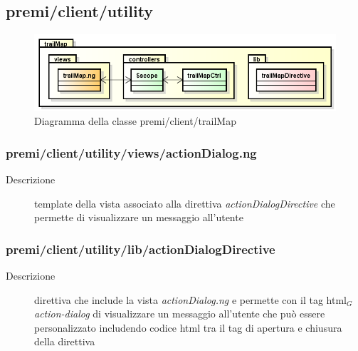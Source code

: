 \clearpage
\subsection{premi/client/utility}
\begin{figure}[H]
\begin{center}
\includegraphics[scale=0.70]{img/diapkg/trailMap.png}
\caption{Diagramma della classe premi/client/trailMap}
\end{center}
\end{figure}

\subsubsection{premi/client/utility/views/actionDialog.ng}

\begin{description}
\item[Descrizione] \hfill
	template della vista associato alla direttiva \textit{actionDialogDirective} che permette di visualizzare un messaggio all'utente	
\end{description}

\subsubsection{premi/client/utility/lib/actionDialogDirective}

\begin{description}
\item[Descrizione] \hfill
	direttiva che include la vista \textit{actionDialog.ng} e permette con il tag html$_G$ \textit{action-dialog} di visualizzare un messaggio all'utente che può essere personalizzato includendo codice html tra il tag di apertura e chiusura della direttiva
\end{description}